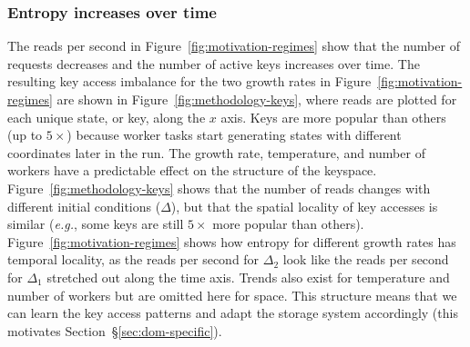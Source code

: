 \subsubsection*{Entropy increases over time} The reads per second in
Figure~\ref{fig:motivation-regimes} show that the number of requests decreases
and the number of active keys increases over time. The resulting key access
imbalance for the two growth rates in Figure~\ref{fig:motivation-regimes} are
shown in Figure~\ref{fig:methodology-keys}, where reads are plotted for each
unique state, or key, along the \(x\) axis. Keys are more popular than others
(up to \(5\times\)) because worker tasks start generating states with different
coordinates later in the run.  The growth rate, temperature, and number of
workers have a predictable effect on the structure of the keyspace.
Figure~\ref{fig:methodology-keys} shows that the number of reads changes with
different initial conditions (\(\Delta\)), but that the spatial locality of key
accesses is similar ({\it e.g.}, some keys are still \(5\times\) more popular
than others).  Figure~\ref{fig:motivation-regimes} shows how entropy for
different growth rates has temporal locality, as the reads per second for
\(\Delta_2\) look like the reads per second for \(\Delta_1\) stretched out
along the time axis.  Trends also exist for temperature and number of workers
but are omitted here for space. This structure means that we can learn the key
access patterns and adapt the storage system accordingly (this motivates
Section~\S\ref{sec:dom-specific}).
